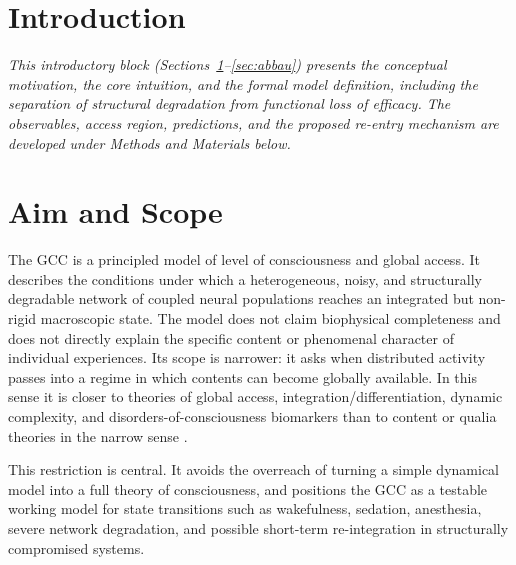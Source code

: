 \documentclass[11pt,a4paper]{article}
\theoremstyle{plain}
\theoremstyle{definition}
\theoremstyle{remark}
\begin{document}

\section*{Introduction}

\noindent\textit{This introductory block (Sections~\ref{sec:ziel}--\ref{sec:abbau}) presents the conceptual motivation, the core intuition, and the formal model definition, including the separation of structural degradation from functional loss of efficacy. The observables, access region, predictions, and the proposed re-entry mechanism are developed under Methods and Materials below.}

\section{Aim and Scope}
\label{sec:ziel}

The GCC is a principled model of level of consciousness and global access. It describes the conditions under which a heterogeneous, noisy, and structurally degradable network of coupled neural populations reaches an integrated but non-rigid macroscopic state. The model does not claim biophysical completeness and does not directly explain the specific content or phenomenal character of individual experiences. Its scope is narrower: it asks when distributed activity passes into a regime in which contents can become globally available. In this sense it is closer to theories of global access, integration/differentiation, dynamic complexity, and disorders-of-consciousness biomarkers than to content or qualia theories in the narrow sense \citep{dehaene1998,tononi2004,mashour2020,boly2013,casali2013,sitt2014,naccache2018,northoff2018}.

This restriction is central. It avoids the overreach of turning a simple dynamical model into a full theory of consciousness, and positions the GCC as a testable working model for state transitions such as wakefulness, sedation, anesthesia, severe network degradation, and possible short-term re-integration in structurally compromised systems.
\end{document}

